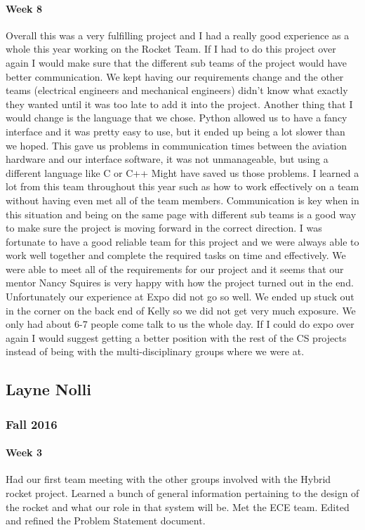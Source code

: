 \documentclass[10pt,draftclsnofoot,onecolumn,retainorgcmds]{IEEEtran}
\begin{document}
\paragraph{Week 8}
Overall this was a very fulfilling project and I had a really good experience as a whole this year working on the Rocket Team. If I had to do this project over again I would make sure that the different sub teams of the project would have better communication. We kept having our requirements change and the other teams (electrical engineers and mechanical engineers) didn’t know what exactly they wanted until it was too late to add it into the project. Another thing that I would change is the language that we chose. Python allowed us to have a fancy interface and it was pretty easy to use, but it ended up being a lot slower than we hoped. This gave us problems in communication times between the aviation hardware and our interface software, it was not unmanageable, but using a different language like C or C++ Might have saved us those problems. I learned a lot from this team throughout this year such as how to work effectively on a team without having even met all of the team members. Communication is key when in this situation and being on the same page with different sub teams is a good way to make sure the project is moving forward in the correct direction. I was fortunate to have a good reliable team for this project and we were always able to work well together and complete the required tasks on time and effectively. We were able to meet all of the requirements for our project and it seems that our mentor Nancy Squires is very happy with how the project turned out in the end. Unfortunately our experience at Expo did not go so well. We ended up stuck out in the corner on the back end of Kelly so we did not get very much exposure. We only had about 6-7 people come talk to us the whole day. If I could do expo over again I would suggest getting a better position with the rest of the CS projects instead of being with the multi-disciplinary groups where we were at.

\subsection{Layne Nolli}
\subsubsection{Fall 2016}
\paragraph{Week 3}
Had our first team meeting with the other groups involved with the Hybrid rocket project. Learned a bunch of general information pertaining to the design of the rocket and what our role in that system will be. Met the ECE team. Edited and refined the Problem Statement document.\\
\end{document}
